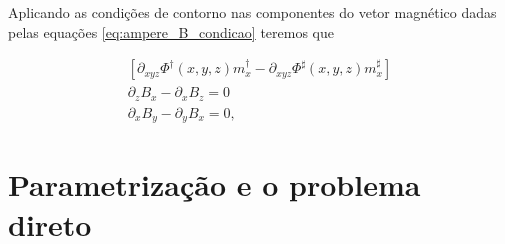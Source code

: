 Aplicando as condições de contorno nas componentes do vetor magnético dadas pelas equações \ref{eq:ampere_B_condicao} teremos que

\begin{equation}
\begin{split}
[\partial_{xyz} \Phi^{\dagger}(x, y, z) m_{x}^{\dagger} - \partial_{xyz} \Phi^{\sharp}(x, y, z) m_{x}^{\sharp}]  \\
\partial_z B_x - \partial_x B_z = 0 \\
\partial_x B_y - \partial_y B_x = 0, 
\end{split}
\label{eq:condicoes_equacao}
\end{equation}


\section{Parametrização e o problema direto}

